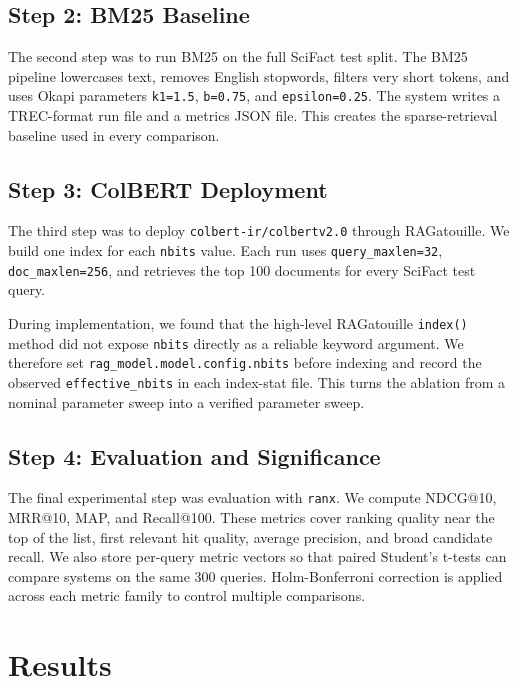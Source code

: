\documentclass[sigconf,nonacm]{acmart}
\begin{document}
\subsection{Step 2: BM25 Baseline}

The second step was to run BM25 on the full SciFact test split. The BM25
pipeline lowercases text, removes English stopwords, filters very short tokens,
and uses Okapi parameters \texttt{k1=1.5}, \texttt{b=0.75}, and
\texttt{epsilon=0.25}. The system writes a TREC-format run file and a metrics
JSON file. This creates the sparse-retrieval baseline used in every comparison.

\subsection{Step 3: ColBERT Deployment}

The third step was to deploy \texttt{colbert-ir/colbertv2.0} through
RAGatouille. We build one index for each \texttt{nbits} value. Each run uses
\texttt{query\_maxlen=32}, \texttt{doc\_maxlen=256}, and retrieves the top 100
documents for every SciFact test query.

During implementation, we found that the high-level RAGatouille
\texttt{index()} method did not expose \texttt{nbits} directly as a reliable
keyword argument. We therefore set \texttt{rag\_model.model.config.nbits}
before indexing and record the observed \texttt{effective\_nbits} in each
index-stat file. This turns the ablation from a nominal parameter sweep into a
verified parameter sweep.

\subsection{Step 4: Evaluation and Significance}

The final experimental step was evaluation with \texttt{ranx}. We compute
NDCG@10, MRR@10, MAP, and Recall@100. These metrics cover ranking quality near
the top of the list, first relevant hit quality, average precision, and broad
candidate recall. We also store per-query metric vectors so that paired
Student's t-tests can compare systems on the same 300 queries. Holm-Bonferroni
correction is applied across each metric family to control multiple
comparisons.

\section{Results}
\end{document}
